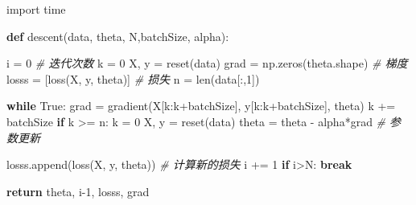 \documentclass[
]{article}
\newenvironment{Shaded}{}{}
\newcommand{\BuiltInTok}[1]{#1}
\newcommand{\CommentTok}[1]{\textcolor[rgb]{0.38,0.63,0.69}{\textit{#1}}}
\newcommand{\ControlFlowTok}[1]{\textcolor[rgb]{0.00,0.44,0.13}{\textbf{#1}}}
\newcommand{\DecValTok}[1]{\textcolor[rgb]{0.25,0.63,0.44}{#1}}
\newcommand{\ImportTok}[1]{#1}
\newcommand{\KeywordTok}[1]{\textcolor[rgb]{0.00,0.44,0.13}{\textbf{#1}}}
\newcommand{\NormalTok}[1]{#1}
\newcommand{\OperatorTok}[1]{\textcolor[rgb]{0.40,0.40,0.40}{#1}}
\newcommand{\VariableTok}[1]{\textcolor[rgb]{0.10,0.09,0.49}{#1}}
\begin{document}
\begin{Shaded}
\begin{Highlighting}[]
\ImportTok{import}\NormalTok{ time}

\KeywordTok{def}\NormalTok{ descent(data, theta, N,batchSize,  alpha):}

\NormalTok{    i }\OperatorTok{=} \DecValTok{0} \CommentTok{\# 迭代次数}
\NormalTok{    k }\OperatorTok{=} \DecValTok{0}
\NormalTok{    X, y }\OperatorTok{=}\NormalTok{ reset(data)}
\NormalTok{    grad }\OperatorTok{=}\NormalTok{ np.zeros(theta.shape) }\CommentTok{\# 梯度}
\NormalTok{    losss }\OperatorTok{=}\NormalTok{ [loss(X, y, theta)] }\CommentTok{\# 损失}
\NormalTok{    n }\OperatorTok{=} \BuiltInTok{len}\NormalTok{(data[:,}\DecValTok{1}\NormalTok{])}
    
    \ControlFlowTok{while} \VariableTok{True}\NormalTok{:}
\NormalTok{        grad }\OperatorTok{=}\NormalTok{ gradient(X[k:k}\OperatorTok{+}\NormalTok{batchSize], y[k:k}\OperatorTok{+}\NormalTok{batchSize], theta)}
\NormalTok{        k }\OperatorTok{+=}\NormalTok{ batchSize}
        \ControlFlowTok{if}\NormalTok{ k }\OperatorTok{\textgreater{}=}\NormalTok{ n: }
\NormalTok{            k }\OperatorTok{=} \DecValTok{0} 
\NormalTok{            X, y }\OperatorTok{=}\NormalTok{ reset(data)}
\NormalTok{        theta }\OperatorTok{=}\NormalTok{ theta }\OperatorTok{{-}}\NormalTok{ alpha}\OperatorTok{*}\NormalTok{grad }\CommentTok{\# 参数更新}

\NormalTok{        losss.append(loss(X, y, theta)) }\CommentTok{\# 计算新的损失}
\NormalTok{        i }\OperatorTok{+=} \DecValTok{1} 
        \ControlFlowTok{if}\NormalTok{ i}\OperatorTok{\textgreater{}}\NormalTok{N: }\ControlFlowTok{break}
    
    \ControlFlowTok{return}\NormalTok{ theta, i}\OperatorTok{{-}}\DecValTok{1}\NormalTok{, losss, grad}
\end{Highlighting}
\end{Shaded}
\end{document}
